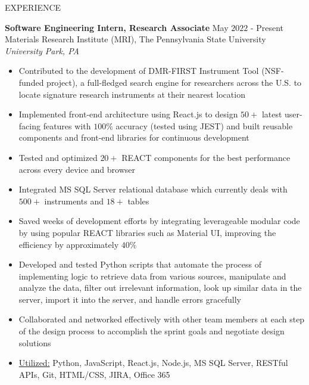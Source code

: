 \documentclass{resume} %
\begin{document}
\begin{rSection}{EXPERIENCE}

\textbf{Software Engineering Intern, Research Associate} \hfill May $2022$ - Present\\
Materials Research Institute (MRI), The Pennsylvania State University \hfill \textit{University Park, PA}
 \begin{itemize}
    \itemsep -3pt {}
     \item Contributed to the development of DMR-FIRST Instrument Tool (NSF-funded project), a full-fledged search engine for researchers across the U.S. to locate signature research instruments at their nearest location
     \item Implemented front-end architecture using React.js to design $50+$ latest user-facing features with $100\%$ accuracy (tested using JEST) and built reusable components and front-end libraries for continuous development
     \item Tested and optimized $20+$ REACT components for the best performance across every device and browser
     \item Integrated MS SQL Server relational database which currently deals with $500+$ instruments and $18+$ tables
     \item Saved weeks of development efforts by integrating leverageable modular code by using popular REACT libraries such as Material UI, improving the efficiency by approximately $40\%$
     \item Developed and tested Python scripts that automate the process of implementing logic to retrieve data from various sources, manipulate and analyze the data, filter out irrelevant information, look up similar data in the server, import it into the server, and handle errors gracefully
     \item Collaborated and networked effectively with other team members at each step of the design process to accomplish the sprint goals and negotiate design solutions 
     \item \underline{Utilized:} Python, JavaScript, React.js, Node.js, MS SQL Server, RESTful APIs, Git, HTML/CSS, JIRA, Office 365
    \end{itemize}

\end{rSection} 
\end{document}
